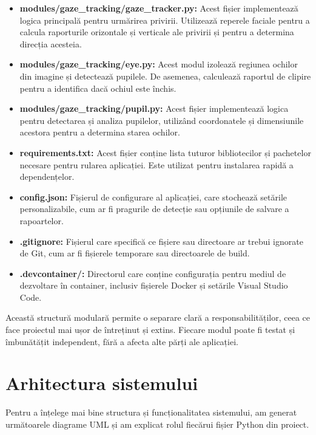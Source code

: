 \documentclass[12pt,a4paper]{article}
\begin{document}
\begin{itemize}
    \item \textbf{modules/gaze\_tracking/gaze\_tracker.py:} Acest fișier implementează logica principală pentru urmărirea privirii. Utilizează reperele faciale pentru a calcula raporturile orizontale și verticale ale privirii și pentru a determina direcția acesteia.

    \item \textbf{modules/gaze\_tracking/eye.py:} Acest modul izolează regiunea ochilor din imagine și detectează pupilele. De asemenea, calculează raportul de clipire pentru a identifica dacă ochiul este închis.

    \item \textbf{modules/gaze\_tracking/pupil.py:} Acest fișier implementează logica pentru detectarea și analiza pupilelor, utilizând coordonatele și dimensiunile acestora pentru a determina starea ochilor.

    \item \textbf{requirements.txt:} Acest fișier conține lista tuturor bibliotecilor și pachetelor necesare pentru rularea aplicației. Este utilizat pentru instalarea rapidă a dependențelor.

    \item \textbf{config.json:} Fișierul de configurare al aplicației, care stochează setările personalizabile, cum ar fi pragurile de detecție sau opțiunile de salvare a rapoartelor.

    \item \textbf{.gitignore:} Fișierul care specifică ce fișiere sau directoare ar trebui ignorate de Git, cum ar fi fișierele temporare sau directoarele de build.

    \item \textbf{.devcontainer/:} Directorul care conține configurația pentru mediul de dezvoltare în container, inclusiv fișierele Docker și setările Visual Studio Code.
\end{itemize}

\hspace{6mm}Această structură modulară permite o separare clară a responsabilităților, ceea ce face proiectul mai ușor de întreținut și extins. Fiecare modul poate fi testat și îmbunătățit independent, fără a afecta alte părți ale aplicației.

\section{Arhitectura sistemului}

Pentru a înțelege mai bine structura și funcționalitatea sistemului, am generat următoarele diagrame UML și am explicat rolul fiecărui fișier Python din proiect.
\end{document}

